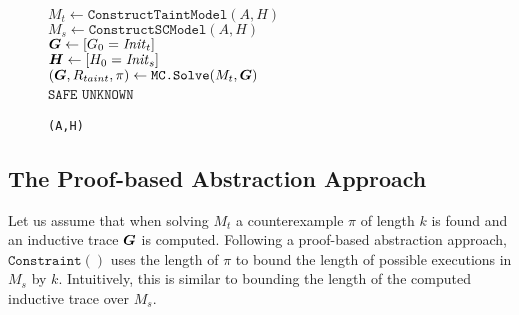 \begin{figure}[!t]
  \begin{algorithm2e}[H]
  \DontPrintSemicolon
  \SetAlgoVlined
  \LinesNumbered
   

  $M_t \gets \texttt{ConstructTaintModel}(A, H)$\\ \label{line:init_s}
  $M_s \gets \texttt{ConstructSCModel}(A, H)$\\
  
  $\vG \gets [G_0=\Init_t]$\\
  $\vH \gets [H_0=\Init_s]$\\ \label{line:init_e}
  \Repeat {$\infty$} {\label{line:main_s}
     $(\vG, R_{taint},\pi)\gets \texttt{MC.Solve}(M_t,\vG)$\label{line:solve_taint}\\
      {
        \Return $\texttt{SAFE}$
     }
  }\label{line:main_e}
  \Return $\texttt{UNKNOWN}$
  \caption{\texttt{\Ifc(A,H)}}
  \label{alg:ifc}
  \end{algorithm2e}
\end{figure}




\subsection{The Proof-based Abstraction Approach}

Let us assume that when solving $M_t$ a counterexample $\pi$ of length $k$ is found and an inductive trace $\vG$ is computed. Following a proof-based abstraction approach, $\texttt{Constraint}()$ uses the length of $\pi$ to bound the length of possible executions in $M_s$ by $k$. Intuitively, this is similar to bounding the length of the computed inductive trace over $M_s$.

